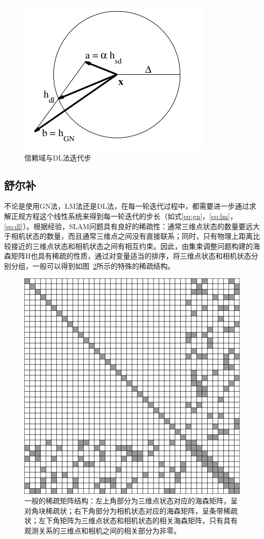 \begin{figure}[htb!]
    \centering
    \includegraphics[width=.3\textwidth]{Pictures/dogleg_step.png}
    \caption{信赖域与DL法迭代步\citep{tingleff2004methods}}
    \label{fig:dogleg_step}
\end{figure}



\subsection{舒尔补}\label{sec:schur}

不论是使用GN法，LM法还是DL法，在每一轮迭代过程中，都需要进一步通过求解正规方程这个线性系统来得到每一轮迭代的步长（如式\eqref{eq:gn}，\eqref{eq:lm}，\eqref{eq:dl}）。根据经验，SLAM问题具有良好的稀疏性：通常三维点状态的数量要远大于相机状态的数量，而且通常三维点之间没有直接联系；同时，只有物理上距离比较接近的三维点状态和相机状态之间有相互约束。因此，由集束调整问题构建的海森矩阵$\mathrm{H}$也具有稀疏的性质，通过对变量适当的排序，将三维点状态和相机状态分别分组，一般可以得到如图~\ref{fig:sparse_matrix}所示的特殊的稀疏结构。

\begin{figure}[htb!]
    \centering
    \includegraphics[width=.5\textwidth]{Pictures/sparse_matrix.png}
    \caption{一般的稀疏矩阵结构：左上角部分为三维点状态对应的海森矩阵，呈对角块稀疏状；右下角部分为相机状态对应的海森矩阵，呈条带稀疏状；左下角矩阵为三维点状态和相机状态的相关海森矩阵，只有具有观测关系的三维点和相机之间的相关部分为非零。}
    \label{fig:sparse_matrix}
\end{figure}


